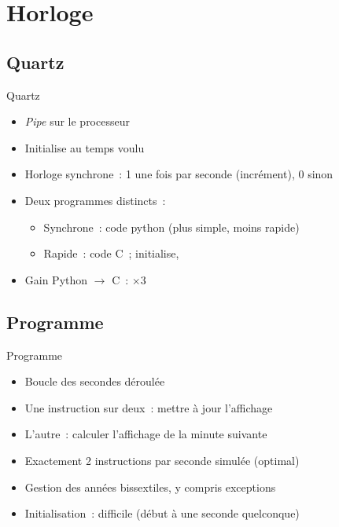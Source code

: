\documentclass[11pt]{beamer}
\begin{document}
\section{Horloge}

\subsection{Quartz}

\begin{frame}{Quartz}
\begin{itemize}
\item \textit{Pipe} sur le processeur
\item Initialise au temps voulu
\item Horloge synchrone~: \alert{1} une fois par seconde (incrément), \alert{0} sinon
\item Deux programmes distincts~:
	\begin{itemize}
	\item Synchrone~: code python (plus simple, moins rapide)
	\item Rapide~: code C~; initialise, 
	\end{itemize}
\item Gain Python $\rightarrow$ C~: $\times 3$
\end{itemize}
\end{frame}

\subsection{Programme}

\begin{frame}{Programme}
\begin{itemize}
\item{Boucle des secondes déroulée}
\item{Une instruction sur deux~: mettre à jour l'affichage}
\item{L'autre~: calculer l'affichage de la minute suivante}
\item{Exactement 2 instructions par seconde simulée (optimal)}
\item{Gestion des années bissextiles, y compris exceptions}
\item{Initialisation~: difficile (début à une seconde quelconque)}
\end{itemize}
\end{frame}

\end{document}

